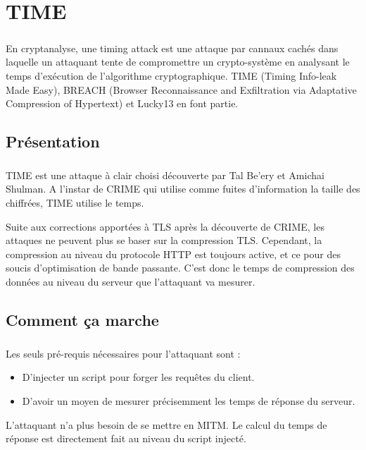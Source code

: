 \chapter{TIME}
\label{chapter:time}

\paragraph{}
En cryptanalyse, une timing attack est une attaque par cannaux cachés dans laquelle un attaquant tente de compromettre un crypto-système en analysant le temps d'exécution de l'algorithme cryptographique. TIME (Timing Info-leak Made Easy), BREACH (Browser Reconnaissance and Exfiltration via Adaptative Compression of Hypertext) et Lucky13 en font partie.

\section{Présentation}
\paragraph{}
TIME est une attaque à clair choisi découverte par Tal Be'ery et Amichai Shulman. A l'instar de CRIME qui utilise comme fuites d'information la taille des chiffrées, TIME utilise le temps.

Suite aux corrections apportées à TLS après la découverte de CRIME, les attaques ne peuvent plus se baser sur la compression TLS. Cependant, la compression au niveau du protocole HTTP est toujours active, et ce pour des soucis d'optimisation de bande passante. C'est donc le temps de compression des données au niveau du serveur que l'attaquant va mesurer.

\section{Comment ça marche}
\paragraph{}
Les seuls pré-requis nécessaires pour l'attaquant sont :
\begin{itemize}
  \item D'injecter un script pour forger les requêtes du client.
  \item D'avoir un moyen de mesurer précisemment les temps de réponse du serveur.
\end{itemize}

L'attaquant n'a plus besoin de se mettre en MITM. Le calcul du temps de réponse est directement fait au niveau du script injecté.

